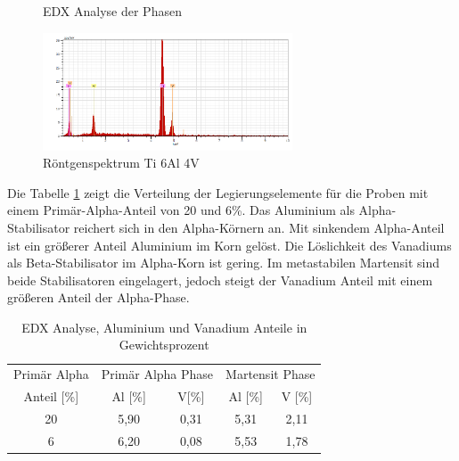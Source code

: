 \documentclass[a4paper, 11pt]{tubsreprt}
\begin{document}
\begin{figure}
\caption{EDX Analyse der Phasen}
\label{EDX Analyse der Phasen}
\end{figure}
\begin{figure}
\centering
\includegraphics[width=0.66\textwidth]{Bilder/Roentgenspektrumti64.png}
\caption{Röntgenspektrum Ti 6Al 4V}
\label{Röntgenspektrum}
\end{figure}

Die Tabelle \ref{Tabelle EDX Analyse} zeigt die Verteilung der Legierungselemente für die Proben mit einem Primär-Alpha-Anteil von 20 und 6\%. Das Aluminium als Alpha-Stabilisator reichert sich in den Alpha-Körnern an. Mit sinkendem Alpha-Anteil ist ein größerer Anteil Aluminium im Korn gelöst. Die Löslichkeit des Vanadiums als Beta-Stabilisator im Alpha-Korn ist gering. Im metastabilen Martensit sind beide Stabilisatoren eingelagert, jedoch steigt der Vanadium Anteil mit einem größeren Anteil der Alpha-Phase.    
\begin{table}
\begin{tabular}{c|c|c|c|c}
Primär Alpha & \multicolumn{2}{c}{Primär Alpha Phase} & \multicolumn{2}{|c}{Martensit Phase} \\
\cline{2-5}
Anteil [\%] & Al [\%] & V[\%] & Al [\%] & V [\%] \\
\hline
20 & 5,90 & 0,31 & 5,31 & 2,11 \\
\hline
6 & 6,20 & 0,08 & 5,53 & 1,78 \\

\end{tabular}
\caption{EDX Analyse, Aluminium und Vanadium Anteile in Gewichtsprozent}
\label{Tabelle EDX Analyse}
\end{table}
\end{document}
